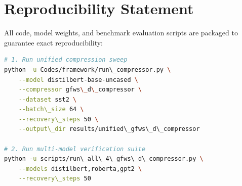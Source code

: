 \section{Reproducibility Statement}
All code, model weights, and benchmark evaluation scripts are packaged to guarantee exact reproducibility:
\begin{lstlisting}[language=bash]
# 1. Run unified compression sweep
python -u Codes/framework/run\_compressor.py \
    --model distilbert-base-uncased \
    --compressor gfws\_d\_compressor \
    --dataset sst2 \
    --batch\_size 64 \
    --recovery\_steps 50 \
    --output\_dir results/unified\_gfws\_d\_compressor

# 2. Run multi-model verification suite
python -u scripts/run\_all\_4\_gfws\_d\_compressor.py \
    --models distilbert,roberta,gpt2 \
    --recovery\_steps 50
\end{lstlisting}
